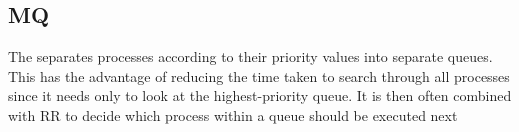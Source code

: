 	\subsection{MQ}

		\par{The  separates processes according to their priority values into separate queues. This has the advantage of reducing the time taken to search through all processes since it needs only to look at the highest-priority queue. It is then often combined with RR to decide which process within a queue should be executed next }


























